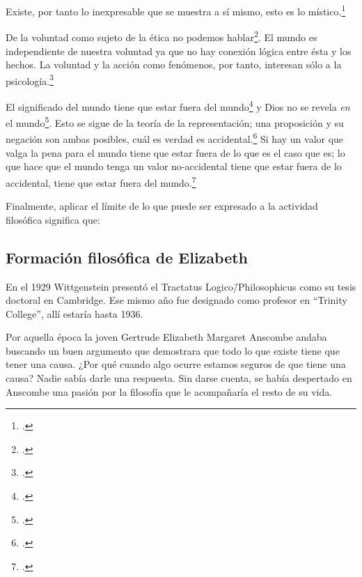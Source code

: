 Existe, por tanto lo inexpresable que se muestra a sí mismo, esto es lo
místico.\footcite[cf.~][6.522]{tractatus}

De la voluntad como sujeto de la ética no podemos
hablar\footcite[cf.~][6.423]{tractatus}. El mundo es independiente de nuestra
voluntad ya que no hay conexión lógica entre ésta y los hechos.
La voluntad y la acción como fenómenos, por tanto, interesan sólo a la
psicología.\footcite[cf.~][p.171 \S3]{IWT}

El significado del mundo tiene que estar fuera del
mundo\footcite[cf.~][6.41]{tractatus} y Dios no se revela \emph{en} el
mundo\footcite[cf.~][6.432]{tractatus}. 
Esto se sigue de la teoría de la representación; una proposición y su negación
son ambas posibles, cuál es verdad es accidental.\footcite[cf.~][p.170 \S4]{IWT}
Si hay un valor que valga la pena para el mundo tiene que estar fuera de lo que
es el caso que es; lo que hace que el mundo tenga un valor no-accidental tiene
que estar fuera de lo accidental, tiene que estar fuera del
mundo.\footcite[cf.~][6.41]{tractatus} 

Finalmente, aplicar el límite de lo que puede ser expresado a la actividad
filosófica significa que:

\subsection{Formación filosófica de Elizabeth}
En el 1929 Wittgenstein presentó el Tractatus Logico\=/Philosophicus como su
tesis doctoral en Cambridge. Ese mismo año fue designado como profesor en
``Trinity College'', allí estaría hasta 1936.

Por aquella época la joven Gertrude Elizabeth Margaret Anscombe andaba buscando
un buen argumento que demostrara que todo lo que existe tiene que tener una
causa. ¿Por qué cuando algo ocurre estamos seguros de que tiene una causa? Nadie
sabía darle una respuesta. Sin darse cuenta, se había despertado en Anscombe
una pasión por la filosofía que le acompañaría el resto de su vida.

